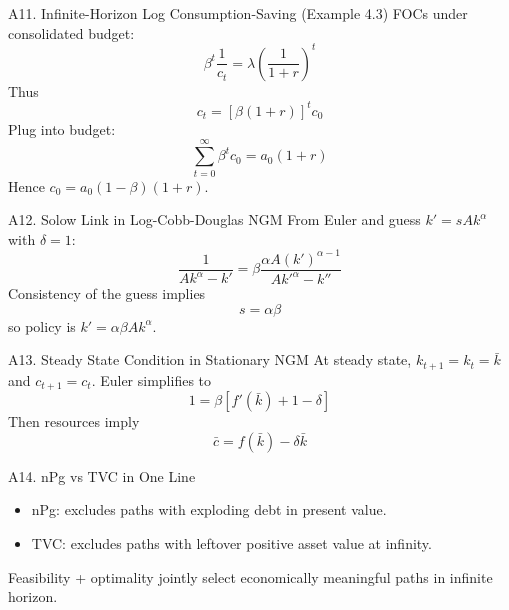 \documentclass[aspectratio=169,10pt]{beamer}
\newcommand{\backbutton}[1]{\hfill\hyperlink{#1}{\beamerbutton{Back}}}
\begin{document}
\begin{frame}{A11. Infinite-Horizon Log Consumption-Saving (Example 4.3)}
FOCs under consolidated budget:
\[
\beta^t\frac{1}{c_t}=\lambda\left(\frac{1}{1+r}\right)^t
\]
Thus
\[
c_t=[\beta(1+r)]^t c_0
\]
Plug into budget:
\[
\sum_{t=0}^{\infty}\beta^t c_0=a_0(1+r)
\]
Hence $c_0=a_0(1-\beta)(1+r)$.
\backbutton{m-a5}
\end{frame}

\begin{frame}{A12. Solow Link in Log-Cobb-Douglas NGM}
From Euler and guess $k'=sAk^\alpha$ with $\delta=1$:
\[
\frac{1}{Ak^\alpha-k'}=\beta\frac{\alpha A (k')^{\alpha-1}}{Ak'^\alpha-k''}
\]
Consistency of the guess implies
\[
s=\alpha\beta
\]
so policy is $k'=\alpha\beta Ak^\alpha$.
\backbutton{m-a6}
\end{frame}

\begin{frame}{A13. Steady State Condition in Stationary NGM}
At steady state, $k_{t+1}=k_t=\bar{k}$ and $c_{t+1}=c_t$.
Euler simplifies to
\[
1=\beta\left[f'(\bar{k})+1-\delta\right]
\]
Then resources imply
\[
\bar{c}=f(\bar{k})-\delta\bar{k}
\]
\backbutton{m-a6}
\end{frame}

\begin{frame}{A14. nPg vs TVC in One Line}
\begin{itemize}
  \item nPg: excludes paths with exploding debt in present value.
  \item TVC: excludes paths with leftover positive asset value at infinity.
\end{itemize}

\medskip
Feasibility + optimality jointly select economically meaningful paths in infinite horizon.
\backbutton{m-a6}
\end{frame}
\end{document}
